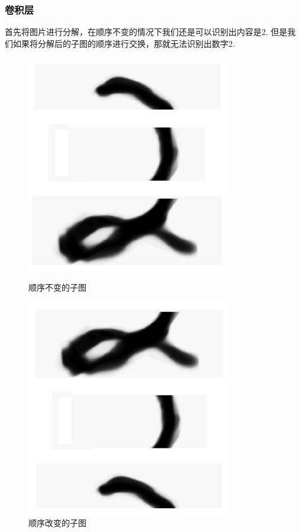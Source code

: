 \documentclass[UTF8]{ctexart}
\begin{document}
\subsubsection{卷积层}
首先将图片进行分解，在顺序不变的情况下我们还是可以识别出内容是2.
但是我们如果将分解后的子图的顺序进行交换，那就无法识别出数字2.
\begin{figure}[htb]
	\centering
	\begin{minipage}[htb]{0.3\textwidth}
		\includegraphics[width=0.80\textwidth]{figures/cnn3.jpg}
		\caption{顺序不变的子图}
		\label{cnn3}
	\end{minipage}
	\begin{minipage}[htb]{0.3\textwidth}
		\includegraphics[width=0.80\textwidth]{figures/cnn4.jpg}
		\caption{顺序改变的子图}
		\label{cnn4}
	\end{minipage}
\end{figure}
\end{document}
